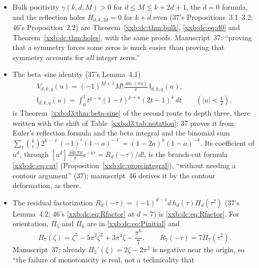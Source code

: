 \documentclass[11pt,a4paper]{article}
\numberwithin{equation}{section}
\theoremstyle{definition}
\theoremstyle{remark}
\theoremstyle{plain}
\newcommand{\Z}{\mathbb Z}
\begin{document}
\begin{itemize}[leftmargin=1.4em,itemsep=1pt]
\begin{equation}
 V_{d,0,q+1}(u)=(u-q-1)V_{d,0,q}(u).
\end{equation}
 Since multiplication cannot carry higher powers of $u$ down, all of this
 may be evaluated in $\Z[u]/(u^{D+1})$ or $(\Z/\mathfrak m\Z)[u]/(u^{D+1})$;
 37 uses $D=d$ for nonvanishing tests and $D=4$ for every moment anchor,
 ``regardless of depth''.
\item Bulk positivity $\gamma(k,d,M)>0$ for $d\le M\le k+2d+1$, the $d=0$
 formula, and the reflection holes $H_{d,k,2d}=0$ for $k+d$ even (37's
 Propositions~3.1--3.2; 46's Proposition~2.2) are Theorem~\ref{xxb:dc:thm:bulk}, \eqref{xxb:dc:eq:d0}
 and Theorem~\ref{xxb:dc:thm:holes}, with the same proofs.  Manuscript~37:
 ``proving that a symmetry forces some zeros is much easier than proving
 that symmetry accounts for \emph{all} integer zeros.''
\item The beta--sine identity (37's Lemma~4.1)
\begin{equation}\label{xxb:d78:eq:I}
 \begin{gathered}
 V_{d,k,q}(u)=(-1)^{M+1}M!\frac{\sin(\pi u)}{\pi}\,\mathsf I_{d,k,q}(u),\\
 \mathsf I_{d,k,q}(u)=\int_0^1t^{q-u}(1-t)^{p+u}(2t-1)^k\,dt\qquad(|u|<\tfrac12),
 \end{gathered}
\end{equation}
 is Theorem~\ref{xxb:d3:thm:beta-sine} of the second route to depth three,
 there written with the shift of Table~\ref{xxb:d3:tab:notation}; 37 proves
 it from Euler's reflection formula and the beta integral
 \cite{dlmf-beta,dlmf-reflection} and the binomial sum
 $\sum_\ell\binom k\ell2^{k-\ell}(-1)^\ell(1-a)^{-\ell}=(1-2a)^k(1-a)^{-k}$.
 Its coefficient of $u^d$, through
 $[u^d]\frac{\sin\pi u}{\pi}e^{-u\tau}=R_d(-\tau)/d!$, is the branch-cut
 formula \eqref{xxb:dc:eq:cut} (Proposition~\ref{xxb:dc:prop:integral}),
 ``without needing a contour argument'' (37); manuscript~46 derives it by the
 contour deformation, as there.
\item The residual factorization $R_d(-\tau)=(-1)^{d-1}d\,h_d(\tau)\Pi_d(\tau^2)$
 (37's Lemma~4.2; 46's \eqref{xxb:dc:eq:Rfactor} at $d=7$) is
 \eqref{xxb:dc:eq:Rfactor}.  For orientation, $\Pi_5$ and $\Pi_6$ are in
 \eqref{xxb:dc:eq:Pinitial} and
\begin{equation}\label{xxb:d78:eq:Pi7}
 \Pi_7(\zeta)=\zeta^3-5\pi^2\zeta^2+3\pi^4\zeta-\frac{\pi^6}{7},\qquad
 R_7(-\tau)=7\Pi_7(\tau^2).
\end{equation}
 Manuscript~37: already $\Pi_5'(\zeta)=2\zeta-2\pi^2$ is negative near the
 origin, so ``the failure of monotonicity is real, not a technicality that

\end{itemize}
\end{document}
